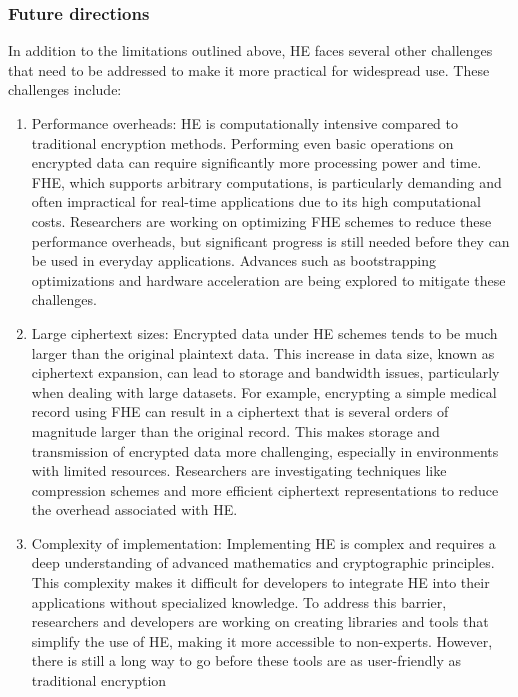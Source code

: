 \documentclass[
  letterpaper,
  DIV=11,
  numbers=noendperiod,
  oneside]{scrartcl}
\begin{document}
\subsubsection{Future directions}\label{future-directions}

In addition to the limitations outlined above, HE faces several other
challenges that need to be addressed to make it more practical for
widespread use. These challenges include:

\begin{enumerate}
\def\labelenumi{\arabic{enumi}.}
\item
  Performance overheads: HE is computationally intensive compared to
  traditional encryption methods. Performing even basic operations on
  encrypted data can require significantly more processing power and
  time. FHE, which supports arbitrary computations, is particularly
  demanding and often impractical for real-time applications due to its
  high computational costs. Researchers are working on optimizing FHE
  schemes to reduce these performance overheads, but significant
  progress is still needed before they can be used in everyday
  applications. Advances such as bootstrapping optimizations and
  hardware acceleration are being explored to mitigate these challenges.
\item
  Large ciphertext sizes: Encrypted data under HE schemes tends to be
  much larger than the original plaintext data. This increase in data
  size, known as ciphertext expansion, can lead to storage and bandwidth
  issues, particularly when dealing with large datasets. For example,
  encrypting a simple medical record using FHE can result in a
  ciphertext that is several orders of magnitude larger than the
  original record. This makes storage and transmission of encrypted data
  more challenging, especially in environments with limited resources.
  Researchers are investigating techniques like compression schemes and
  more efficient ciphertext representations to reduce the overhead
  associated with HE.
\item
  Complexity of implementation: Implementing HE is complex and requires
  a deep understanding of advanced mathematics and cryptographic
  principles. This complexity makes it difficult for developers to
  integrate HE into their applications without specialized knowledge. To
  address this barrier, researchers and developers are working on
  creating libraries and tools that simplify the use of HE, making it
  more accessible to non-experts. However, there is still a long way to
  go before these tools are as user-friendly as traditional encryption

\end{enumerate}
\end{document}
